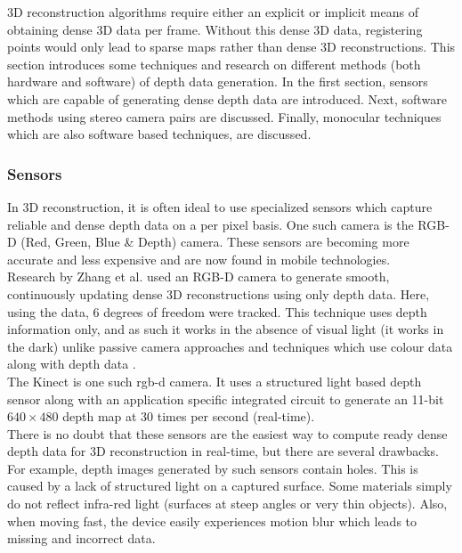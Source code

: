 
3D reconstruction algorithms require either an explicit or implicit means of obtaining dense 3D data per frame. Without this dense 3D data, registering points would only lead to sparse maps rather than dense 3D reconstructions. This section introduces some techniques and research on different methods (both hardware and software) of depth data generation. In the first section, sensors which are capable of generating dense depth data are introduced. Next, software methods using stereo camera pairs are discussed. Finally, monocular techniques which are also software based techniques, are discussed. \\


\subsubsection{Sensors}

In 3D reconstruction, it is often ideal to use specialized sensors which capture reliable and dense depth data on a per pixel basis. One such camera is the RGB-D (Red, Green, Blue \& Depth) camera. These sensors are becoming more accurate and less expensive and are now found in mobile technologies. \\

Research by Zhang et al. \cite{Zhang12Microsoft} used an RGB-D camera to generate smooth, continuously updating dense 3D reconstructions using only depth data. Here, using the data, 6 degrees of freedom were tracked. This technique uses depth information only, and as such it works in the absence of visual light (it works in the dark) unlike passive camera approaches \cite{Klein07Parallel, Newcombe10Live,Stuhmer10Real} and techniques which use colour data along with depth data \cite{Henry10Rgb}. \\

The Kinect is one such rgb-d camera. It uses a structured light based depth sensor along with an application specific integrated circuit to generate an 11-bit $640\times 480$ depth map at 30 times per second (real-time). \\

There is no doubt that these sensors are the easiest way to compute ready dense depth data for 3D reconstruction in real-time, but there are several drawbacks. For example, depth images generated by such sensors contain holes. This is caused by a lack of structured light on a captured surface. Some materials simply do not reflect infra-red light (surfaces at steep angles or very thin objects). Also, when moving fast, the device easily experiences motion blur which leads to missing and incorrect data. \\

